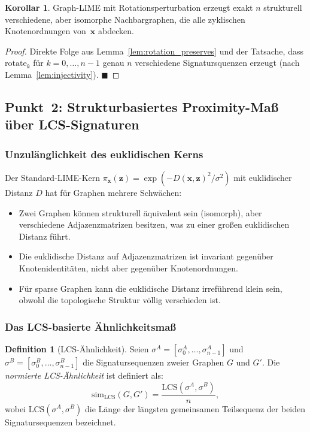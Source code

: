 ﻿\documentclass[a4paper,12pt]{article}
\theoremstyle{definition}
\newtheorem{definition}{Definition}[section]
\newtheorem{korollar}{Korollar}[section]
\begin{document}
\begin{korollar}
  Graph-LIME mit Rotationsperturbation erzeugt exakt $n$ strukturell verschiedene,
  aber isomorphe Nachbargraphen, die alle zyklischen Knotenordnungen von~$\mathbf{x}$
  abdecken.
\end{korollar}

\begin{proof}
  Direkte Folge aus Lemma~\ref{lem:rotation_preserves} und der Tatsache, dass
  $\mathrm{rotate}_k$ für $k = 0, \ldots, n-1$ genau $n$ verschiedene Signatursquenzen
  erzeugt (nach Lemma~\ref{lem:injectivity}). \hfill$\blacksquare$
\end{proof}

\subsection{Punkt~2: Strukturbasiertes Proximity-Maß über LCS-Signaturen}

\subsubsection{Unzulänglichkeit des euklidischen Kerns}

Der Standard-LIME-Kern $\pi_\mathbf{x}(\mathbf{z}) = \exp(-D(\mathbf{x},\mathbf{z})^2/\sigma^2)$
mit euklidischer Distanz $D$ hat für Graphen mehrere Schwächen:
\begin{itemize}
  \item Zwei Graphen können strukturell äquivalent sein (isomorph), aber
        verschiedene Adjazenzmatrizen besitzen, was zu einer großen euklidischen
        Distanz führt.
  \item Die euklidische Distanz auf Adjazenzmatrizen ist invariant gegenüber
        Knotenidentitäten, nicht aber gegenüber Knotenordnungen.
  \item Für sparse Graphen kann die euklidische Distanz irreführend klein sein,
        obwohl die topologische Struktur völlig verschieden ist.
\end{itemize}

\subsubsection{Das LCS-basierte Ähnlichkeitsmaß}

\begin{definition}[LCS-Ähnlichkeit]
  Seien $\sigma^A = [\sigma_0^A, \ldots, \sigma_{n-1}^A]$ und
  $\sigma^B = [\sigma_0^B, \ldots, \sigma_{n-1}^B]$ die Signatursequenzen zweier
  Graphen $G$ und $G'$.
  Die \emph{normierte LCS-Ähnlichkeit} ist definiert als:
  \begin{equation}
    \mathrm{sim}_{\mathrm{LCS}}(G, G')
    = \frac{\mathrm{LCS}(\sigma^A, \sigma^B)}{n},
    \label{eq:lcs_sim}
  \end{equation}
  wobei $\mathrm{LCS}(\sigma^A, \sigma^B)$ die Länge der längsten gemeinsamen
  Teilsequenz der beiden Signatursequenzen bezeichnet.
\end{definition}
\end{document}

